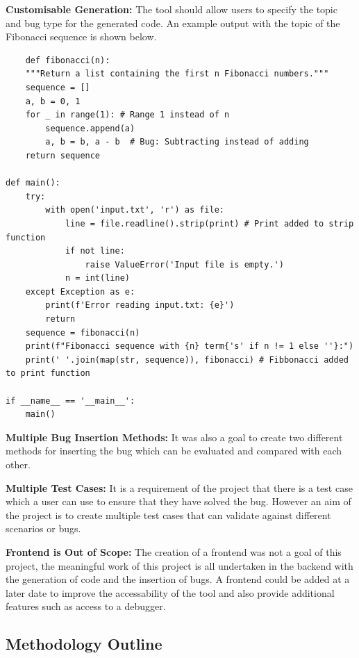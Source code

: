 \documentclass[12pt]{extarticle}
\begin{document}
\textbf{Customisable Generation:} The tool should allow users to specify the topic and bug type for the generated code. An example output with the topic of the Fibonacci sequence is shown below. 
\begin{lstlisting}
    def fibonacci(n):
    """Return a list containing the first n Fibonacci numbers."""
    sequence = []
    a, b = 0, 1
    for _ in range(1): # Range 1 instead of n
        sequence.append(a)
        a, b = b, a - b  # Bug: Subtracting instead of adding   
    return sequence

def main():
    try:
        with open('input.txt', 'r') as file:
            line = file.readline().strip(print) # Print added to strip function
            if not line:
                raise ValueError('Input file is empty.')
            n = int(line)
    except Exception as e:
        print(f'Error reading input.txt: {e}')
        return
    sequence = fibonacci(n)
    print(f"Fibonacci sequence with {n} term{'s' if n != 1 else ''}:")
    print(' '.join(map(str, sequence)), fibonacci) # Fibbonacci added to print function

if __name__ == '__main__':
    main()
\end{lstlisting}

\textbf{Multiple Bug Insertion Methods:} It was also a goal to create two different methods for inserting the bug which can be evaluated and compared with each other.

\textbf{Multiple Test Cases:} It is a requirement of the project that there is a test case which a user can use to ensure that they have solved the bug. However an aim of the project is to create multiple test cases that can validate against different scenarios or bugs.

\textbf{Frontend is Out of Scope:} The creation of a frontend was not a goal of this project, the meaningful work of this project is all undertaken in the backend with the generation of code and the insertion of bugs. A frontend could be added at a later date to improve the accessability of the tool and also provide additional features such as access to a debugger.

\subsection{Methodology Outline}
\end{document}

